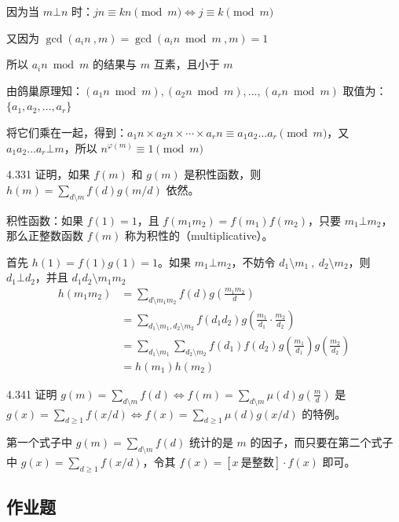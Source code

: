 因为当 \( m \bot n \) 时：\( jn \equiv kn \pmod{m} \Leftrightarrow j \equiv k \pmod{m} \)

又因为 \( \gcd(a_i n \ , m) = \gcd(a_i n \bmod m \ , m) = 1 \)

所以 \( a_i n \bmod m \) 的结果与 \( m \) 互素，且小于 \( m \)

由鸽巢原理知：\( (a_1 n \bmod m) , (a_2 n \bmod m) , \dots , (a_r n \bmod m) \) 取值为：\( \{ a_1, a_2, \dots , a_r \} \)

将它们乘在一起，得到：\( a_1 n \times a_2 n \times \cdots \times a_r n \equiv a_1 a_2 \dots a_r \pmod{m} \)，又 \( a_1 a_2 \dots a_r \bot m \)，所以 \( n^{\varphi(m)} \equiv 1 \pmod{m} \)

\begin{problem}{4.33}{1}
  证明，如果 \( f(m) \) 和 \( g(m) \) 是积性函数，则 \( h(m) = \sum_{d \setminus m} f(d) g(m / d) \) 依然。
\end{problem}

积性函数：如果 \( f(1) = 1 \)，且 \( f(m_1 m_2) = f(m_1) f(m_2) \)，只要 \( m_1 \bot m_2 \)，那么正整数函数 \( f(m) \) 称为积性的（multiplicative）。

首先 \( h(1) = f(1)g(1) = 1 \)。如果 \( m_1 \bot m_2 \)，不妨令 \( d_1 \setminus m_1 \ , \ d_2 \setminus m_2 \)，则 \( d_1 \bot d_2 \)，并且 \( d_1 d_2 \setminus m_1 m_2 \)
\begin{align*}
  h(m_1 m_2) &= \sum_{d \setminus m_1 m_2} f(d) g(\frac{m_1 m_2}{d}) \\
  &= \sum_{d_1 \setminus m_1, d_2 \setminus m_2} f(d_1 d_2) g(\frac{m_1}{d_1} \cdot \frac{m_2}{d_2}) \\
  &= \sum_{d_1 \setminus m_1} \sum_{d_2 \setminus m_2} f(d_1) f(d_2) g(\frac{m_1}{d_1}) g(\frac{m_2}{d_2}) \\
  &= h(m_1) h(m_2)
\end{align*}

\begin{problem}{4.34}{1}
  证明 \( g(m) = \sum_{d \setminus m} f(d) \Leftrightarrow f(m) = \sum_{d \setminus m} \mu (d) g(\frac{m}{d}) \) 是 \( g(x) = \sum_{d \ge 1} f(x/d) \Leftrightarrow f(x) = \sum_{d \ge 1} \mu (d) g(x/d) \) 的特例。
\end{problem}

第一个式子中 \( g(m) = \sum_{d \setminus m} f(d) \) 统计的是 \( m \) 的因子，而只要在第二个式子中 \( g(x) = \sum_{d \ge 1} f(x/d) \)，令其 \( f(x) = [x \ \text{是整数}] \cdot f(x) \) 即可。

\subsection{作业题}

